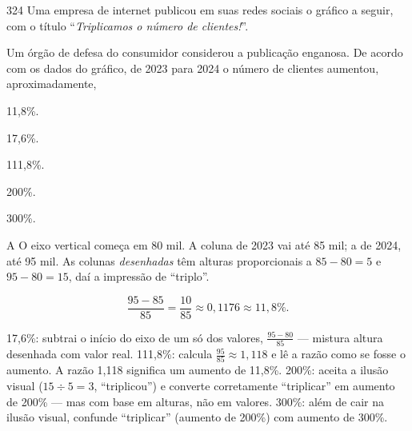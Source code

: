 \begin{questaoinedita}{3}{24}
Uma empresa de internet publicou em suas redes sociais o gráfico a seguir, com
o título “\textit{Triplicamos o número de clientes!}”.

\begin{center}
\end{center}

Um órgão de defesa do consumidor considerou a publicação enganosa. De acordo
com os dados do gráfico, de 2023 para 2024 o número de clientes aumentou,
aproximadamente,
\begin{alternativas*}[5]
\item 11,8\%.
\item 17,6\%.
\item 111,8\%.
\item 200\%.
\item 300\%.
\end{alternativas*}
\end{questaoinedita}
\begin{resolucao}{A}
 O eixo vertical começa em 80 mil. A coluna de 2023 vai até 85 mil; a de 2024, até 95 mil. As colunas \emph{desenhadas} têm alturas proporcionais a $85-80=5$ e $95-80=15$, daí a impressão de “triplo”.

\[
\frac{95-85}{85}=\frac{10}{85}\approx0{,}1176\approx11{,}8\%.
\]

\begin{distratores}
 17,6\%: subtrai o início do eixo de um só dos valores, $\frac{95-80}{85}$ — mistura altura desenhada com valor real.
 111,8\%: calcula $\frac{95}{85}\approx1{,}118$ e lê a razão como se fosse o aumento. A razão 1,118 significa um aumento de 11,8\%.
 200\%: aceita a ilusão visual ($15\div5=3$, “triplicou”) e converte corretamente “triplicar” em aumento de 200\% — mas com base em alturas, não em valores.
 300\%: além de cair na ilusão visual, confunde “triplicar” (aumento de 200\%) com aumento de 300\%.
\end{distratores}
\end{resolucao}

